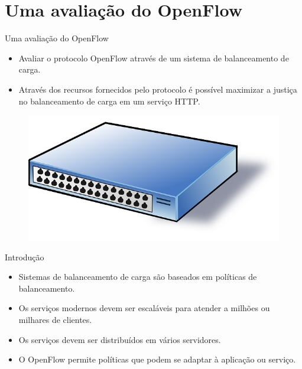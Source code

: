 \section{Uma avaliação do OpenFlow}

\begin{frame}{Uma avaliação do OpenFlow}

    \begin{itemize}
        \item Avaliar o protocolo OpenFlow através de um sistema de
            balanceamento de carga.
        \item Através dos recursos fornecidos pelo protocolo é possível 
            maximizar a justiça no balanceamento de carga em um serviço HTTP.
    \end{itemize}

    \begin{figure}[!htb]
        \centering
        \includegraphics[scale=.3]{images/cartoon-switch}
    \end{figure}
\end{frame}


\begin{frame}{Introdução}
    \begin{itemize}
        \setlength{\itemsep}{.5cm}
        \item Sistemas de balanceamento de carga são baseados em políticas 
            de balanceamento.
        \item Os serviços modernos devem ser escaláveis para atender a 
            milhões ou milhares de clientes.
        \item Os serviços devem ser distribuídos em vários servidores. 
        \item O OpenFlow permite políticas que podem se adaptar à aplicação 
            ou serviço.
    \end{itemize} 
\end{frame}


